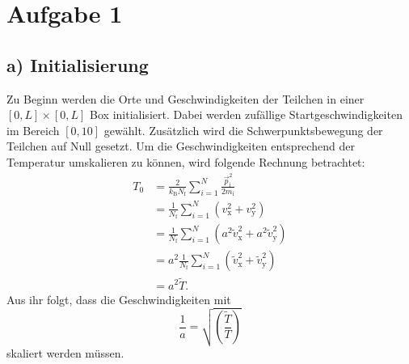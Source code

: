 \section*{Aufgabe 1}


\subsection*{a) Initialisierung}

Zu Beginn werden die Orte und Geschwindigkeiten der Teilchen in einer $[0,L] \times [0,L]$ Box initialisiert.
Dabei werden zufällige Startgeschwindigkeiten im Bereich \([0, 10]\) gewählt.
Zusätzlich wird die Schwerpunktsbewegung der Teilchen auf Null gesetzt.
Um die Geschwindigkeiten entsprechend der Temperatur umskalieren zu können, wird folgende Rechnung betrachtet:
\begin{align*}
    T_0 &=
    \frac{2}{k_\text{B} N_\text{f}} \sum_{i=1}^N \frac{\vec{p}_\text{i}^2}{2 m_\text{i}} \\
    &= \frac{1}{N_\text{f}} \sum_{i=1}^N \left(v_\text{x}^2 + v_\text{y}^2\right) \\
    &= \frac{1}{N_\text{f}} \sum_{i=1}^N
        \left(a^2 \tilde{v}_\text{x}^2 + a^2 \tilde{v}_\text{y}^2\right) \\
    &= a^2 \frac{1}{N_\text{f}} \sum_{i=1}^N
        \left(\tilde{v}_\text{x}^2 + \tilde{v}_\text{y}^2\right) \\
    &= a^2 \tilde{T}.
\end{align*}
Aus ihr folgt, dass die Geschwindigkeiten mit
\begin{equation*}
    \frac{1}{a} = \sqrt{\!\left(\frac{\tilde{T}}{T}\right)}
\end{equation*}
skaliert werden müssen.

